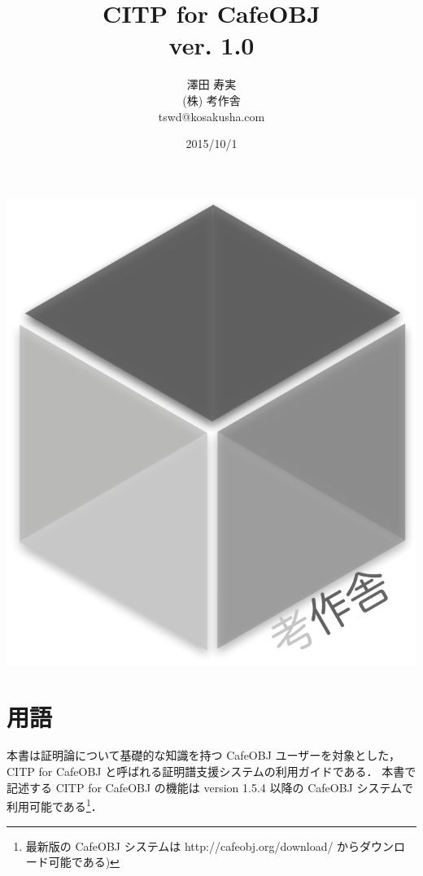 \documentclass[a4paper,oneside,10pt,here]{memoir}
\begin{document}
\tightlists
\sloppy
\raggedbottom
{}
\frontmatter
\pagestyle{empty}
\title{CITP for CafeOBJ \\
ver. 1.0}
\vfill
\author{澤田 寿実\\
  (株) 考作舎\\
  tswd@kosakusha.com}
\date{2015/10/1}
\maketitle
\vfill
\begin{center}
\includegraphics[scale=0.2]{kosakusha2_gray.pdf}
\end{center}
\vfill
\thispagestyle{empty}
\newpage
\mainmatter
\pagestyle{plain}
\tableofcontents
\EnableBpAbbreviations
\newpage
\chapter{用語}\label{sec:terms}
本書は証明論について基礎的な知識を持つ CafeOBJ ユーザーを対象とした，
CITP for CafeOBJ と呼ばれる証明譜支援システムの利用ガイドである．
本書で記述する CITP for CafeOBJ の機能は version 1.5.4 以降の
CafeOBJ システムで利用可能である\footnote{最新版の CafeOBJ システムは http://cafeobj.org/download/ からダウンロード可能である)}．
\end{document}
